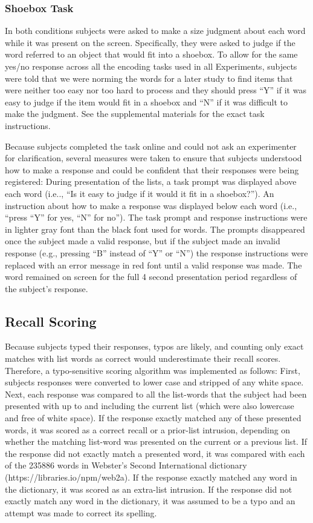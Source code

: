 \documentclass[man,natbib,floatsintext]{apa6} %
\begin{document}
\subsubsection{Shoebox Task} In both conditions subjects were asked to make a size judgment about each word while it was present on the screen. Specifically, they were asked  to judge if the word referred to an object that would fit into a shoebox. To allow for the same yes/no response across all the encoding tasks used in all Experiments, subjects were told that we were norming the words for a later study to find items that were neither too easy nor too hard to process and they should press ``Y'' if it was easy to judge if the item would fit in a shoebox and ``N'' if it was difficult to make the judgment. See the supplemental materials for the exact task instructions.

Because subjects completed the task online and could not ask an experimenter for clarification, several measures were taken to ensure that subjects understood how to make a response and could be confident that their responses were being registered: During presentation of the lists, a task prompt was displayed above each word (i.e.., ``Is it easy to judge if it would it fit in a shoebox?''). An instruction about how to make a response was displayed below each word (i.e., ``press ``Y'' for yes, ``N'' for no''). The task prompt and response instructions were in lighter gray font than the black font used for words. The prompts disappeared once the subject made a valid response, but if the subject made an invalid response (e.g., pressing ``B'' instead of ``Y'' or ``N'') the response instructions were replaced with an error message in red font until a valid response was made. The word remained on screen for the full 4 second presentation period regardless of the subject's response.

\subsection{Recall Scoring}
Because subjects typed their responses, typos are likely, and counting only exact matches with list words as correct would underestimate their recall scores. Therefore, a typo-sensitive scoring algorithm was implemented as follows: First, subjects responses were converted to lower case and stripped of any white space. Next, each response was compared to all the list-words that the subject had been presented with up to and including the current list (which were also lowercase and free of white space). If the response exactly matched any of these presented words, it was scored as a correct recall or a prior-list intrusion, depending on whether the matching list-word was presented on the current or a previous list. If the response did not exactly match a presented word, it was compared with each of the 235886 words in Webster's Second International dictionary (https://libraries.io/npm/web2a). If the response exactly matched any word in the dictionary, it was scored as an extra-list intrusion. If the response did not exactly match any word in the dictionary, it was assumed to be a typo and an attempt was made to correct its spelling.
\end{document}
